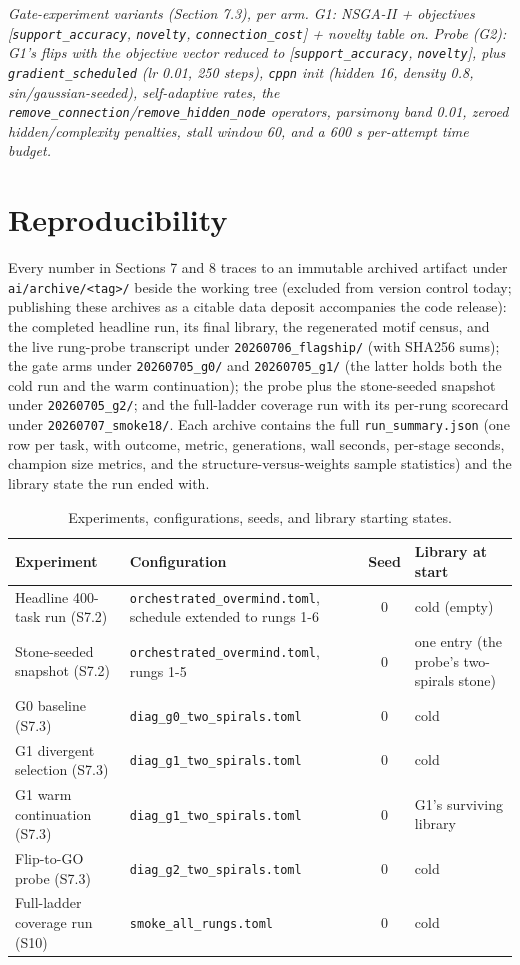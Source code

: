 \documentclass[11pt]{article}
\begin{document}
\emph{Gate-experiment variants (Section 7.3), per arm. G1: NSGA-II + objectives [\texttt{support_accuracy}, \texttt{novelty}, \texttt{connection_cost}] + novelty table on. Probe (G2): G1's flips with the objective vector reduced to [\texttt{support_accuracy}, \texttt{novelty}], plus \texttt{gradient_scheduled} (lr 0.01, 250 steps), \texttt{cppn} init (hidden 16, density 0.8, sin/gaussian-seeded), self-adaptive rates, the \texttt{remove_connection}/\texttt{remove_hidden_node} operators, parsimony band 0.01, zeroed hidden/complexity penalties, stall window 60, and a 600 s per-attempt time budget.}

\section{Reproducibility}

Every number in Sections 7 and 8 traces to an immutable archived artifact under \texttt{ai/archive/<tag>/} beside the working tree (excluded from version control today; publishing these archives as a citable data deposit accompanies the code release): the completed headline run, its final library, the regenerated motif census, and the live rung-probe transcript under \texttt{20260706_flagship/} (with SHA256 sums); the gate arms under \texttt{20260705_g0/} and \texttt{20260705_g1/} (the latter holds both the cold run and the warm continuation); the probe plus the stone-seeded snapshot under \texttt{20260705_g2/}; and the full-ladder coverage run with its per-rung scorecard under \texttt{20260707_smoke18/}. Each archive contains the full \texttt{run_summary.json} (one row per task, with outcome, metric, generations, wall seconds, per-stage seconds, champion size metrics, and the structure-versus-weights sample statistics) and the library state the run ended with.

\begin{table}[htbp]
\centering
\small
\caption{Experiments, configurations, seeds, and library starting states.}
\label{tab:reproducibility}
\begin{tabularx}{\textwidth}{@{}L L c L@{}}
\toprule
Experiment & Configuration & Seed & Library at start \\
\midrule
Headline 400-task run (S7.2) & \texttt{orchestrated_overmind.toml}, schedule extended to rungs 1-6 & 0 & cold (empty) \\
Stone-seeded snapshot (S7.2) & \texttt{orchestrated_overmind.toml}, rungs 1-5 & 0 & one entry (the probe's two-spirals stone) \\
G0 baseline (S7.3) & \texttt{diag_g0_two_spirals.toml} & 0 & cold \\
G1 divergent selection (S7.3) & \texttt{diag_g1_two_spirals.toml} & 0 & cold \\
G1 warm continuation (S7.3) & \texttt{diag_g1_two_spirals.toml} & 0 & G1's surviving library \\
Flip-to-GO probe (S7.3) & \texttt{diag_g2_two_spirals.toml} & 0 & cold \\
Full-ladder coverage run (S10) & \texttt{smoke_all_rungs.toml} & 0 & cold \\
\bottomrule
\end{tabularx}
\end{table}
\end{document}
